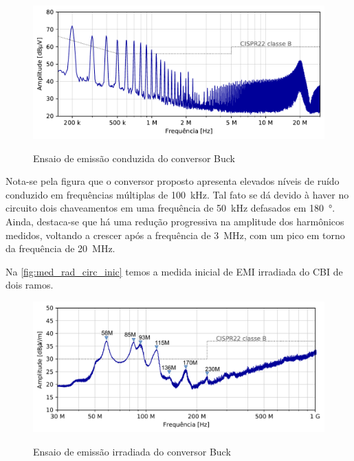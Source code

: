     \begin{figure}[H]
    	\centering
    	\caption{Ensaio de emissão conduzida do conversor Buck \Interleaved}
    	\includegraphics[scale=.9]{pdf/cond/Circuito inicial.pdf}
    	\label{fig:med_cond_circ_inic}
    \end{figure}
    
    Nota-se pela figura que o conversor proposto apresenta elevados níveis de ruído conduzido em frequências múltiplas de \qty{100}{\kilo\hertz}. Tal fato se dá devido à haver no circuito dois chaveamentos em uma frequência de \qty{50}{\kilo\hertz} defasados em \qty{180}{\degree}. Ainda, destaca-se que há uma redução progressiva na amplitude dos harmônicos medidos, voltando a crescer após a frequência de \qty{3}{\mega\hertz}, com um pico em torno da frequência de \qty{20}{\mega\hertz}.
    
    Na \autoref{fig:med_rad_circ_inic} temos a medida inicial de EMI irradiada do CBI de dois ramos. 
    
    \begin{figure}[H]
    	\centering
    	\caption{Ensaio de emissão irradiada do conversor Buck \Interleaved}
    	\includegraphics[scale=.9]{pdf/rad/Circuito inicial_2.pdf}
    	\label{fig:med_rad_circ_inic}
    \end{figure}
    
